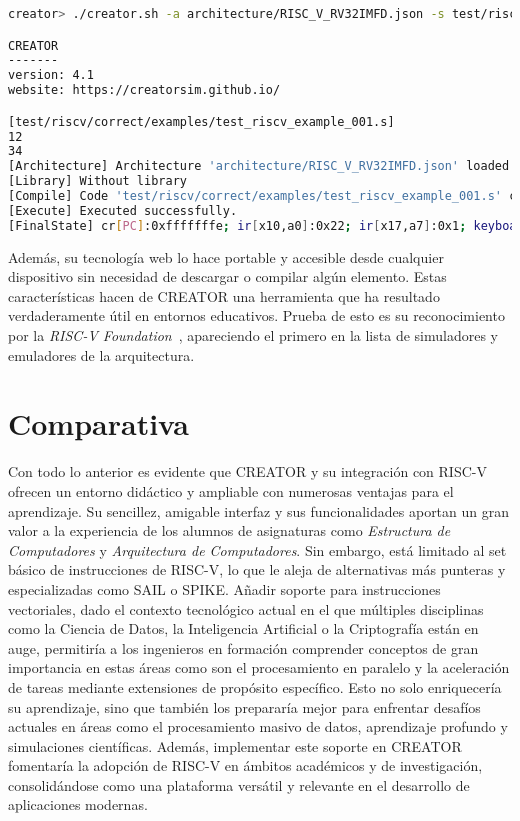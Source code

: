\vfill
\vspace{0.5cm}
\begin{lstlisting}[caption=Interfaz por línea de comandos de CREATOR, label={lst:creator-cli}, language=bash]
creator> ./creator.sh -a architecture/RISC_V_RV32IMFD.json -s test/riscv/correct/examples/test_riscv_example_001.s

CREATOR
-------
version: 4.1
website: https://creatorsim.github.io/

[test/riscv/correct/examples/test_riscv_example_001.s]
12
34
[Architecture] Architecture 'architecture/RISC_V_RV32IMFD.json' loaded successfully.
[Library] Without library
[Compile] Code 'test/riscv/correct/examples/test_riscv_example_001.s' compiled successfully.
[Execute] Executed successfully.
[FinalState] cr[PC]:0xfffffffe; ir[x10,a0]:0x22; ir[x17,a7]:0x1; keyboard[0x0]:''; display[0x0]:'1234';
\end{lstlisting}

Además, su tecnología web lo hace portable y accesible desde cualquier
dispositivo sin necesidad de descargar o compilar algún elemento. Estas
características hacen de CREATOR una herramienta que ha resultado
verdaderamente útil en entornos educativos. Prueba de esto es su reconocimiento
por la \textit{RISC-V Foundation}~\cite{creator-riscvFoundation}, apareciendo
el primero en la lista de simuladores y emuladores de la arquitectura.


\section{Comparativa}

Con todo lo anterior es evidente que CREATOR y su integración con RISC-V
ofrecen un entorno didáctico y ampliable con numerosas ventajas para el
aprendizaje. Su sencillez, amigable interfaz y sus funcionalidades aportan un
gran valor a la experiencia de los alumnos de asignaturas como
\textit{Estructura de Computadores} y \textit{Arquitectura de Computadores}.
Sin embargo, está limitado al set básico de instrucciones de RISC-V, lo
que le aleja de alternativas más punteras y especializadas como SAIL o SPIKE\@.
Añadir soporte para instrucciones vectoriales, dado el contexto tecnológico
actual en el que múltiples disciplinas como la Ciencia de Datos, la Inteligencia Artificial o la Criptografía
están en auge, permitiría a los ingenieros en formación comprender conceptos de gran importancia en estas áreas
como son el procesamiento en paralelo y la aceleración de tareas mediante
extensiones de propósito específico. Esto no solo enriquecería su aprendizaje,
sino que también los prepararía mejor para enfrentar desafíos actuales en áreas
como el procesamiento masivo de datos, aprendizaje profundo y simulaciones
científicas. Además, implementar este soporte en CREATOR fomentaría la adopción
de RISC-V en ámbitos académicos y de investigación, consolidándose como una
plataforma versátil y relevante en el desarrollo de aplicaciones modernas.

